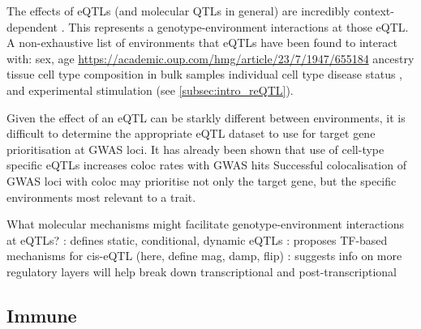 \begin{outline}
\1 The effects of \glspl{eQTL} (and molecular \glspl{QTL} in general) are incredibly context-dependent \autocite{albert2015RoleRegulatoryVariation,vandiedonck2017GeneticAssociationMolecular}.
    \2 This represents a genotype-environment interactions at those eQTL.
    \2 A non-exhaustive list of environments that \glspl{eQTL} have been found to interact with:
        \3 sex, age \url{https://academic.oup.com/hmg/article/23/7/1947/655184}
        \3 ancestry \autocite{dejager2015ImmVarProjectInsights,nedelec2016GeneticAncestryNatural,quach2017LivingAdaptiveWorld}
        \3 tissue \autocite{nica2011ArchitectureGeneRegulatory,aguet2017GeneticEffectsGene}
        \3 cell type composition in bulk samples \autocite{westra2015CellSpecificEQTL,zhernakova2017IdentificationContextdependentExpression,glastonbury2019CellTypeHeterogeneityAdipose,kim-hellmuth2019CellTypeSpecific}
        \3 individual cell type \autocite{dimas2009CommonRegulatoryVariation,dejager2015ImmVarProjectInsights,peters2016InsightGenotypePhenotypeAssociations,chen2016GeneticDriversEpigenetic,kim-hellmuth2019CellTypeSpecific}
        \3 disease status \autocite{peters2016InsightGenotypePhenotypeAssociations},
        \3 and experimental stimulation (see \autoref{subsec:intro_reQTL}).

\1 Given the effect of an eQTL can be starkly different between environments, it is difficult to determine the appropriate \gls{eQTL} dataset to use for target gene prioritisation at GWAS loci.
    \2 It has already been shown that use of cell-type specific eQTLs increases coloc rates with GWAS hits \autocite{kim-hellmuth2019CellTypeSpecific}
    \2 Successful colocalisation of GWAS loci with coloc may prioritise not only the target gene, but the specific environments most relevant to a trait.

\1 What molecular mechanisms might facilitate genotype-environment interactions at \glspl{eQTL}?
    \2 \autocite{ackermann2013ImpactNaturalGenetic}: defines static, conditional, dynamic eQTLs
    \2 \autocite{fu2012UnravelingRegulatoryMechanisms}: proposes TF-based mechanisms for cis-eQTL (here, define mag, damp, flip)
    \2 \autocite{gaffney2013GlobalPropertiesFunctional,rotival2019CharacterisingGeneticBasis}: suggests info on more regulatory layers will help break down transcriptional and post-transcriptional


\subsection{Immune }
\label{subsec:intro_reQTL}


\end{outline}
